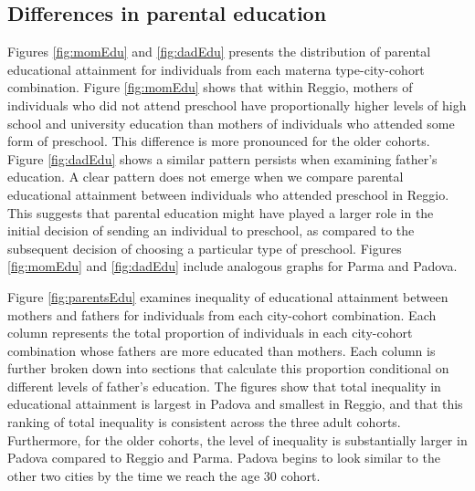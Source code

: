 \subsection{Differences in parental education}

Figures \ref{fig:momEdu} and \ref{fig:dadEdu} presents the distribution of parental educational attainment for individuals from each materna type-city-cohort combination. Figure \ref{fig:momEdu} shows that within Reggio, mothers of individuals who did not attend preschool have proportionally higher levels of high school and university education than mothers of individuals who attended some form of preschool. This difference is more pronounced for the older cohorts. Figure \ref{fig:dadEdu} shows a similar pattern persists when examining father's education. A clear pattern does not emerge when we compare parental educational attainment between individuals who attended preschool in Reggio. This suggests that parental education might have played a larger role in the initial decision of sending an individual to preschool, as compared to the subsequent decision of choosing a particular type of preschool. Figures \ref{fig:momEdu} and \ref{fig:dadEdu} include analogous graphs for Parma and Padova.

Figure \ref{fig:parentsEdu} examines inequality of educational attainment between mothers and fathers for individuals from each city-cohort combination. Each column represents the total proportion of individuals in each city-cohort combination whose fathers are more educated than mothers. Each column is further broken down into sections that calculate this proportion conditional on different levels of father's education. The figures show that total inequality in educational attainment is largest in Padova and smallest in Reggio, and that this ranking of total inequality is consistent across the three adult cohorts. Furthermore, for the older cohorts, the level of inequality is substantially larger in Padova compared to Reggio and Parma. Padova begins to look similar to the other two cities by the time we reach the age 30 cohort. 


